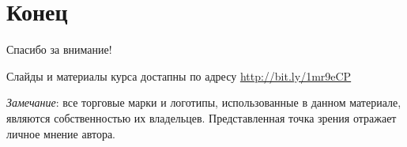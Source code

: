 \documentclass{beamer}
\begin{document}
\section{Конец}
\begin{frame}

{\huge{Спасибо за внимание!}\par}

\vfill

Слайды и материалы курса достапны по адресу \url{http://bit.ly/1mr9eCP} %

\vfill

\tiny{\textit{Замечание}: все торговые марки и логотипы, использованные в данном материале, являются собственностью их владельцев. Представленная точка зрения отражает личное мнение автора.
}

\end{frame}

\end{document}
